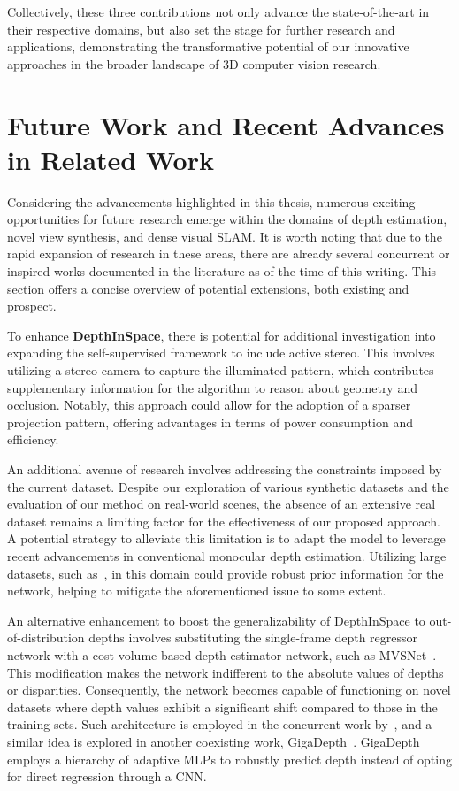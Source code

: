  Collectively, these three contributions not only advance the state-of-the-art in their respective domains, but also set the stage for further research and applications, demonstrating the transformative potential of our innovative approaches in the broader landscape of 3D computer vision research.

\section{Future Work and Recent Advances in Related Work}

Considering the advancements highlighted in this thesis, numerous exciting opportunities for future research emerge within the domains of depth estimation, novel view synthesis, and dense visual SLAM. It is worth noting that due to the rapid expansion of research in these areas, there are already several concurrent or inspired works documented in the literature as of the time of this writing. This section offers a concise overview of potential extensions, both existing and prospect.


To enhance \textbf{DepthInSpace}, there is potential for additional investigation into expanding the self-supervised framework to include active stereo. This involves utilizing a stereo camera to capture the illuminated pattern, which contributes supplementary information for the algorithm to reason about geometry and occlusion. Notably, this approach could allow for the adoption of a sparser projection pattern, offering advantages in terms of power consumption and efficiency.

An additional avenue of research involves addressing the constraints imposed by the current dataset. Despite our exploration of various synthetic datasets and the evaluation of our method on real-world scenes, the absence of an extensive real dataset remains a limiting factor for the effectiveness of our proposed approach. A potential strategy to alleviate this limitation is to adapt the model to leverage recent advancements in conventional monocular depth estimation. Utilizing large datasets, such as~\cite{ranftl2020towards}, in this domain could provide robust prior information for the network, helping to mitigate the aforementioned issue to some extent.

An alternative enhancement to boost the generalizability of DepthInSpace to out-of-distribution depths involves substituting the single-frame depth regressor network with a cost-volume-based depth estimator network, such as MVSNet~\citep{yao2018mvsnet}. This modification makes the network indifferent to the absolute values of depths or disparities. Consequently, the network becomes capable of functioning on novel datasets where depth values exhibit a significant shift compared to those in the training sets. Such architecture is employed in the concurrent work by~\cite{li2023self}, and a similar idea is explored in another coexisting work, GigaDepth~\citep{schreiberhuber2022gigadepth}. GigaDepth employs a hierarchy of adaptive MLPs to robustly predict depth instead of opting for direct regression through a CNN.

